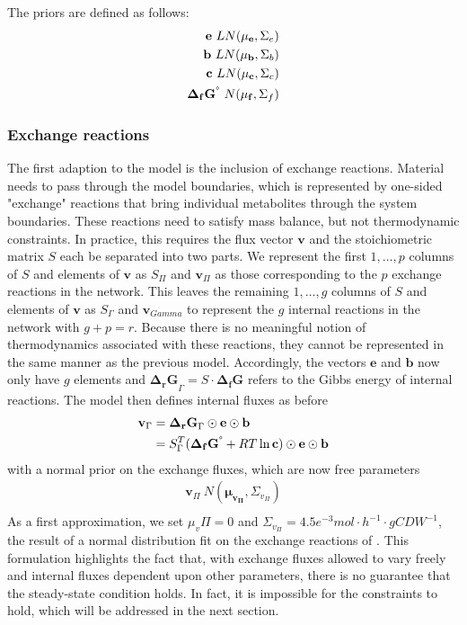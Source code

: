 \documentclass[10pt,letterpaper]{article}
\newcommand{\dgf}{\Delta_fG}
\newcommand{\sdgf}{\Delta_fG^{\degree}}
\newcommand{\dgr}{\Delta_rG}
\newcommand{\bdgf}{\mathbf{\dgf}}
\newcommand{\bsdgf}{\mathbf{\sdgf}}
\newcommand{\bdgr}{\mathbf{\dgr}}
\newcommand{\be}{\mathbf{e}}
\newcommand{\bc}{\mathbf{c}}
\newcommand{\bb}{\mathbf{b}}
\newcommand{\bv}{\mathbf{v}}
\begin{document}
The priors are defined as follows:
\begin{align*}
    \be ~ LN(\mathbf{\mu_e}, \Sigma_e) \\
    \bb ~ LN(\mathbf{\mu_b}, \Sigma_b) \\
    \bc ~ LN(\mathbf{\mu_c}, \Sigma_c) \\
    \bsdgf ~ N(\mathbf{\mu_{f}}, \Sigma_{f}) \\
\end{align*}

\subsubsection{Exchange reactions}
The first adaption to the model is the inclusion of exchange reactions.
Material needs to pass through the model boundaries, which is represented by one-sided "exchange" reactions that bring individual metabolites through the system boundaries.
These reactions need to satisfy mass balance, but not thermodynamic constraints.
In practice, this requires the flux vector $\bv$ and the stoichiometric matrix $S$ each be separated into two parts.
We represent the first $1,\dots,p$ columns of $S$ and elements of $\bv$ as $S_\Pi$ and $\bv_\Pi$ as those corresponding to the $p$ exchange reactions in the network.
This leaves the remaining $1,\dots,g$ columns of $S$ and elements of $\bv$ as $S_\Gamma$ and $\bv_{Gamma}$ to represent the $g$ internal reactions in the network with $g+p=r$.
Because there is no meaningful notion of thermodynamics associated with these reactions, they cannot be represented in the same manner as the previous model.
Accordingly, the vectors $\be$ and $\bb$ now only have $g$ elements and $\bdgr_{\Gamma} = S\cdot \bdgf$ refers to the Gibbs energy of internal reactions.
The model then defines internal fluxes as before
\begin{align}
    \bv_\Gamma &= \bdgr_{\Gamma} \odot \be \odot \bb \\
        &= S_{\Gamma}^T (\bsdgf + RT\ln{\bc}) \odot \be \odot \bb \\
\end{align}
with a normal prior on the exchange fluxes, which are now free parameters
\begin{align*}
    \bv_{\Pi} ~ N(\mathbf{\mu_{v_{\Pi}}}, \Sigma_{v_{\Pi}}) \\
\end{align*}
As a first approximation, we set $\mu_v{\Pi}=0$ and $\Sigma_{v_{\Pi}}=4.5e^{-3} mol\cdot h^{-1} \cdot gCDW^{-1}$, the result of a normal distribution fit on the exchange reactions of \cite{GEROSA_2015_dataset_pseudo_transition}.
This formulation highlights the fact that, with exchange fluxes allowed to vary freely and internal fluxes dependent upon other parameters, there is no guarantee that the steady-state condition holds.
In fact, it is impossible for the constraints to hold, which will be addressed in the next section.
\end{document}
